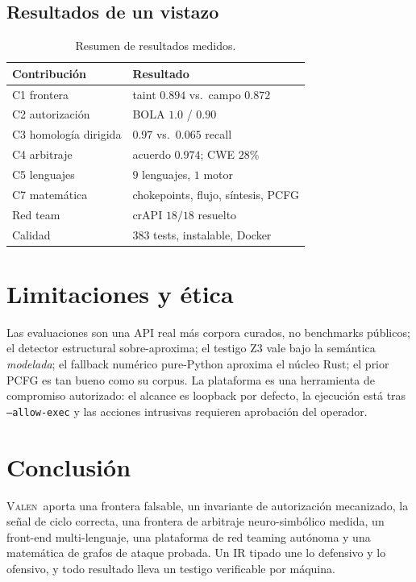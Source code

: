 \documentclass[journal]{IEEEtran}
\newcommand{\valen}{\textsc{Valen}}
\begin{document}
\subsection{Resultados de un vistazo}
\begin{table}[!t]
\centering\small
\begin{tabular}{@{}ll@{}}
\toprule
\textbf{Contribución} & \textbf{Resultado} \\
\midrule
C1 frontera & taint $0.894$ vs.\ campo $0.872$ \\
C2 autorización & BOLA $1.0$ / $0.90$ \\
C3 homología dirigida & $0.97$ vs.\ $0.065$ recall \\
C4 arbitraje & acuerdo $0.974$; CWE $28\%$ \\
C5 lenguajes & $9$ lenguajes, $1$ motor \\
C7 matemática & chokepoints, flujo, síntesis, PCFG \\
Red team & crAPI $18/18$ resuelto \\
Calidad & $383$ tests, instalable, Docker \\
\bottomrule
\end{tabular}
\caption{Resumen de resultados medidos.}
\label{tab:results}
\end{table}

\section{Limitaciones y ética}
Las evaluaciones son una API real más corpora curados, no benchmarks públicos; el
detector estructural sobre-aproxima; el testigo Z3 vale bajo la semántica
\emph{modelada}; el fallback numérico pure-Python aproxima el núcleo Rust; el prior
PCFG es tan bueno como su corpus. La plataforma es una herramienta de compromiso
autorizado: el alcance es loopback por defecto, la ejecución está tras
\texttt{--allow-exec} y las acciones intrusivas requieren aprobación del operador.

\section{Conclusión}
\valen\ aporta una frontera falsable, un invariante de autorización mecanizado, la
señal de ciclo correcta, una frontera de arbitraje neuro-simbólico medida, un
front-end multi-lenguaje, una plataforma de red teaming autónoma y una matemática
de grafos de ataque probada. Un IR tipado une lo defensivo y lo ofensivo, y todo
resultado lleva un testigo verificable por máquina.
\end{document}
